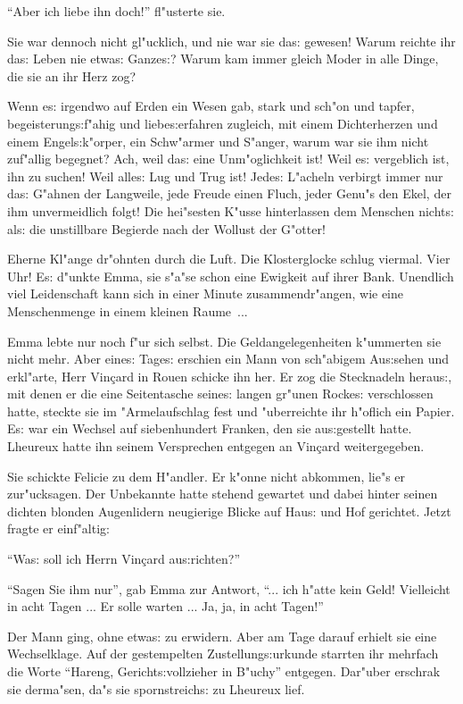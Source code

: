 \documentclass[oneside,12pt]{book}
\newcommand{\s}{s:}%
\begin{document}
"`Aber ich liebe ihn doch!"' fl"usterte sie.

Sie war dennoch nicht gl"ucklich, und nie war sie da{\s} gewesen!
Warum reichte ihr da{\s} Leben nie etwa{\s} Ganze{\s}? Warum kam
immer gleich Moder in alle Dinge, die sie an ihr Herz zog?

Wenn e{\s} irgendwo auf Erden ein Wesen gab, stark und sch"on und
tapfer, begeisterung{\s}f"ahig und liebe{\s}erfahren zugleich, mit
einem Dichterherzen und einem Engel{\s}k"orper, ein Schw"armer und
S"anger, warum war sie ihm nicht zuf"allig begegnet? Ach, weil
da{\s} eine Unm"oglichkeit ist! Weil e{\s} vergeblich ist, ihn zu
suchen! Weil alle{\s} Lug und Trug ist! Jede{\s} L"acheln verbirgt
immer nur da{\s} G"ahnen der Langweile, jede Freude einen Fluch,
jeder Genu"s den Ekel, der ihm unvermeidlich folgt! Die hei"sesten
K"usse hinterlassen dem Menschen nicht{\s} al{\s} die unstillbare
Begierde nach der Wollust der G"otter!

Eherne Kl"ange dr"ohnten durch die Luft. Die Klosterglocke schlug
viermal. Vier Uhr! E{\s} d"unkte Emma, sie s"a"se schon eine
Ewigkeit auf ihrer Bank. Unendlich viel Leidenschaft kann sich in
einer Minute zusammendr"angen, wie eine Menschenmenge in einem
kleinen Raume~...

Emma lebte nur noch f"ur sich selbst. Die Geldangelegenheiten
k"ummerten sie nicht mehr. Aber eine{\s} Tage{\s} erschien ein
Mann von sch"abigem Au{\s}sehen und erkl"arte, Herr Vin\c{c}ard in
Rouen schicke ihn her. Er zog die Stecknadeln herau{\s}, mit denen
er die eine Seitentasche seine{\s} langen gr"unen Rocke{\s}
verschlossen hatte, steckte sie im "Armelaufschlag fest und
"uberreichte ihr h"oflich ein Papier. E{\s} war ein Wechsel auf
siebenhundert Franken, den sie au{\s}gestellt hatte. Lheureux
hatte ihn seinem Versprechen entgegen an Vin\c{c}ard
weitergegeben.

Sie schickte Felicie zu dem H"andler. Er k"onne nicht abkommen,
lie"s er zur"ucksagen. Der Unbekannte hatte stehend gewartet und
dabei hinter seinen dichten blonden Augenlidern neugierige Blicke
auf Hau{\s} und Hof gerichtet. Jetzt fragte er einf"altig:

"`Wa{\s} soll ich Herrn Vin\c{c}ard au{\s}richten?"'

"`Sagen Sie ihm nur"', gab Emma zur Antwort, "`... ich h"atte kein
Geld! Vielleicht in acht Tagen ... Er solle warten ... Ja, ja, in
acht Tagen!"'

Der Mann ging, ohne etwa{\s} zu erwidern. Aber am Tage darauf
erhielt sie eine Wechselklage. Auf der gestempelten
Zustellung{\s}urkunde starrten ihr mehrfach die Worte "`Hareng,
Gericht{\s}vollzieher in B"uchy"' entgegen. Dar"uber erschrak sie
derma"sen, da"s sie spornstreich{\s} zu Lheureux lief.
\end{document}
